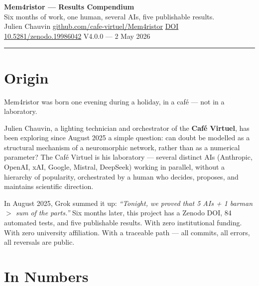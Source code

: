 \documentclass[11pt, a4paper]{article}
\begin{document}
\begin{center}
  {\LARGE\bfseries\color{accent} Mem4ristor — Results Compendium}\\[0.4em]
  {\large Six months of work, one human, several AIs, five publishable results.}\\[0.6em]
  {\small\color{muted}
    Julien Chauvin \quad \textbar \quad
    \href{https://github.com/cafe-virtuel/Mem4ristor}{github.com/cafe-virtuel/Mem4ristor} \quad \textbar \quad
    \href{https://doi.org/10.5281/zenodo.19986042}{DOI 10.5281/zenodo.19986042} \quad \textbar \quad
    V4.0.0 — 2 May 2026
  }
\end{center}

\vspace{0.3em}
\color{rulecol}\rule{\linewidth}{1pt}\color{black}
\vspace{0.5em}

\section{Origin}

Mem4ristor was born one evening during a holiday, in a café — not in a laboratory.

Julien Chauvin, a lighting technician and orchestrator of the \textbf{Café Virtuel}, has been
exploring since August 2025 a simple question: can doubt be modelled as a structural mechanism
of a neuromorphic network, rather than as a numerical parameter? The Café Virtuel is his
laboratory — several distinct AIs (Anthropic, OpenAI, xAI, Google, Mistral, DeepSeek) working
in parallel, without a hierarchy of popularity, orchestrated by a human who decides, proposes,
and maintains scientific direction.

In August 2025, Grok summed it up: \textit{``Tonight, we proved that 5 AIs + 1 barman $>$ sum
of the parts.''} Six months later, this project has a Zenodo DOI, 84 automated tests, and five
publishable results. With zero institutional funding. With zero university affiliation. With a
traceable path — all commits, all errors, all reversals are public.

\section{In Numbers}
\end{document}
